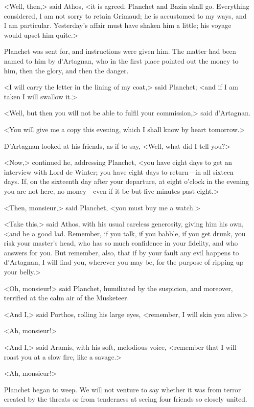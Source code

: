 <Well, then,> said Athos, <it is agreed. Planchet and Bazin shall go. Everything considered, I am not sorry to retain Grimaud; he is accustomed to my ways, and I am particular. Yesterday's affair must have shaken him a little; his voyage would upset him quite.> 

Planchet was sent for, and instructions were given him. The matter had been named to him by d'Artagnan, who in the first place pointed out the money to him, then the glory, and then the danger. 

<I will carry the letter in the lining of my coat,> said Planchet; <and if I am taken I will swallow it.> 

<Well, but then you will not be able to fulfil your commission,> said d'Artagnan. 

<You will give me a copy this evening, which I shall know by heart tomorrow.> 

D'Artagnan looked at his friends, as if to say, <Well, what did I tell you?> 

<Now,> continued he, addressing Planchet, <you have eight days to get an interview with Lord de Winter; you have eight days to return---in all sixteen days. If, on the sixteenth day after your departure, at eight o'clock in the evening you are not here, no money---even if it be but five minutes past eight.> 

<Then, monsieur,> said Planchet, <you must buy me a watch.> 

<Take this,> said Athos, with his usual careless generosity, giving him his own, <and be a good lad. Remember, if you talk, if you babble, if you get drunk, you risk your master's head, who has so much confidence in your fidelity, and who answers for you. But remember, also, that if by your fault any evil happens to d'Artagnan, I will find you, wherever you may be, for the purpose of ripping up your belly.> 

<Oh, monsieur!> said Planchet, humiliated by the suspicion, and moreover, terrified at the calm air of the Musketeer. 

<And I,> said Porthos, rolling his large eyes, <remember, I will skin you alive.> 

<Ah, monsieur!> 

<And I,> said Aramis, with his soft, melodious voice, <remember that I will roast you at a slow fire, like a savage.> 

<Ah, monsieur!> 

Planchet began to weep. We will not venture to say whether it was from terror created by the threats or from tenderness at seeing four friends so closely united. 

